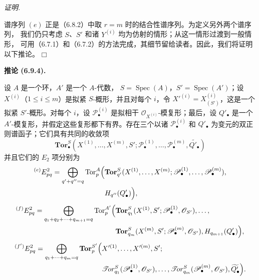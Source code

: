 \documentclass[UTF8,fontset=none,11pt,oneside,openany]{ctexbook}
\providecommand{\square}{\mdlgwhtsquare}
\newenvironment{corollary}[1][]{%
  \par\medskip\noindent\textbf{推论 (#1).}\ %
}{\par}
\newenvironment{proof}{%
  \par\smallskip\noindent\textit{证明.}\ %
}{\hfill$\square$\par}
\begin{document}
\begin{proof}
谱序列 $(e)$ 正是（6.8.2）中取 $r=m$ 时的结合性谱序列。为定义另外两个谱序列，
我们仍只考虑 $S$、$S'$ 和诸 $Y^{(i)}$ 均为仿射的情形；从这一情形过渡到一般情形，
可用（6.7.1）和（6.7.2）的方法完成，其细节留给读者。因此，我们将证明以下推论。
\end{proof}

\begin{corollary}[6.9.4]
设 $A$ 是一个环，$A'$ 是一个 $A$-代数，
$S=\operatorname{Spec}(A)$，$S'=\operatorname{Spec}(A')$；设
$X^{(i)}$（$1\leq i\leq m$）是拟紧 $S$-概形，并且对每个
$i$，令 $X'^{(i)}=X_{(S')}^{(i)}$，这是一个拟紧 $S'$-概形。对每个
$i$，设 $\mathscr P_\bullet^{(i)}$ 是拟相干
$\mathscr O_{X^{(i)}}$-模复形；最后，设 $Q'_\bullet$ 是一个
$A'$-模复形，并假定这些复形都下有界。存在三个以诸
$\mathscr P_\bullet^{(i)}$ 和 $Q'_\bullet$ 为变元的双正则谱函子；它们具有共同的收敛项
\[
  \mathbf{Tor}_\bullet^S
  (X^{(1)},\ldots,X^{(m)},S';
   \mathscr P_\bullet^{(1)},\ldots,\mathscr P_\bullet^{(m)},
   \widetilde{Q'_\bullet})
\]
并且它们的 $E_2$ 项分别为
\[
\begin{split}
  {}^{(e)}E_{pq}^2
  =\bigoplus_{q'+q''=q}
  \operatorname{Tor}_p^A\Bigl(
  &\mathbf{Tor}_{q'}^S
  (X^{(1)},\ldots,X^{(m)};
   \mathscr P_\bullet^{(1)},\ldots,\mathscr P_\bullet^{(m)}),\\
  &H_{q''}(Q'_\bullet)
  \Bigr),
\end{split}
\]
\[
\begin{split}
  {}^{(f)}E_{pq}^2
  =\bigoplus_{q_1+q_2+\cdots+q_{m+1}=q}
  \operatorname{Tor}_p^{A'}\Bigl(
  &\mathbf{Tor}_{q_1}^S
  (X^{(1)},S';\mathscr P_\bullet^{(1)},\mathscr O_{S'}),\ldots,\\
  &\mathbf{Tor}_{q_m}^S
  (X^{(m)},S';\mathscr P_\bullet^{(m)},\mathscr O_{S'}),
  H_{q_{m+1}}(Q'_\bullet)
  \Bigr),
\end{split}
\]
\[
\begin{split}
  {}^{(f')}E_{pq}^2
  =\bigoplus_{q_1+\cdots+q_m=q}
  \mathbf{Tor}_p^{S'}\Bigl(
  &X'^{(1)},\ldots,X'^{(m)},S';\\
  &\mathscr{T}\!or_{q_1}^S
  (\mathscr P_\bullet^{(1)},\mathscr O_{S'}),\ldots,
  \mathscr{T}\!or_{q_m}^S
  (\mathscr P_\bullet^{(m)},\mathscr O_{S'}),
  \widetilde{Q'_\bullet}
  \Bigr).
\end{split}
\]
\end{corollary}
\end{document}
